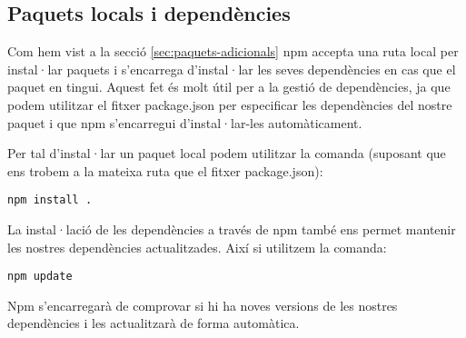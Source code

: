 \subsection{Paquets locals i dependències}

Com hem vist a la secció \ref{sec:paquets-adicionals} npm accepta una ruta local per instal·lar paquets i s'encarrega d'instal·lar les seves dependències en cas que el paquet en tingui. Aquest fet és molt útil per a la gestió de dependències, ja que podem utilitzar el fitxer package.json per especificar les dependències del nostre paquet i que npm s'encarregui d'instal·lar-les automàticament. 

Per tal d'instal·lar un paquet local podem utilitzar la comanda (suposant que ens trobem a la mateixa ruta que el fitxer package.json): 

\begin{verbatim}
npm install . 
\end{verbatim}

La instal·lació de les dependències a través de npm també ens permet mantenir les nostres dependències actualitzades. Així si utilitzem la comanda: 

\begin{verbatim}
npm update
\end{verbatim}

Npm s'encarregarà de comprovar si hi ha noves versions de les nostres dependències i les actualitzarà de forma automàtica. 




